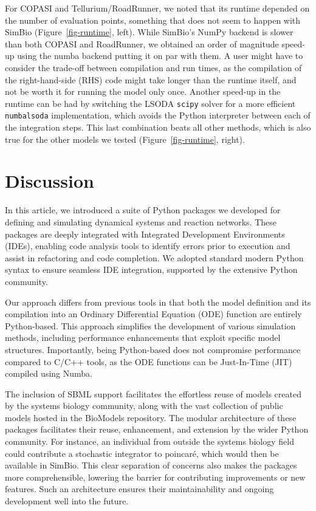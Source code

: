 \documentclass[
  letterpaper,
  DIV=11,
  numbers=noendperiod]{scrartcl}
\begin{document}
For COPASI and Tellurium/RoadRunner, we noted that its runtime depended
on the number of evaluation points, something that does not seem to
happen with SimBio (Figure~\ref{fig-runtime}, left). While SimBio's
NumPy backend is slower than both COPASI and RoadRunner, we obtained an
order of magnitude speed-up using the numba backend putting it on par
with them. A user might have to consider the trade-off between
compilation and run times, as the compilation of the right-hand-side
(RHS) code might take longer than the runtime itself, and not be worth
it for running the model only once. Another speed-up in the runtime can
be had by switching the LSODA \texttt{scipy} solver for a more efficient
\texttt{numbalsoda} implementation, which avoids the Python interpreter
between each of the integration steps. This last combination beats all
other methods, which is also true for the other models we tested
(Figure~\ref{fig-runtime}, right).

\hypertarget{discussion}{%
\section{Discussion}\label{discussion}}

In this article, we introduced a suite of Python packages we developed
for defining and simulating dynamical systems and reaction networks.
These packages are deeply integrated with Integrated Development
Environments (IDEs), enabling code analysis tools to identify errors
prior to execution and assist in refactoring and code completion. We
adopted standard modern Python syntax to ensure seamless IDE
integration, supported by the extensive Python community.

Our approach differs from previous tools in that both the model
definition and its compilation into an Ordinary Differential Equation
(ODE) function are entirely Python-based. This approach simplifies the
development of various simulation methods, including performance
enhancements that exploit specific model structures. Importantly, being
Python-based does not compromise performance compared to C/C++ tools, as
the ODE functions can be Just-In-Time (JIT) compiled using Numba.

The inclusion of SBML support facilitates the effortless reuse of models
created by the systems biology community, along with the vast collection
of public models hosted in the BioModels repository. The modular
architecture of these packages facilitates their reuse, enhancement, and
extension by the wider Python community. For instance, an individual
from outside the systems biology field could contribute a stochastic
integrator to poincaré, which would then be available in SimBio. This
clear separation of concerns also makes the packages more
comprehensible, lowering the barrier for contributing improvements or
new features. Such an architecture ensures their maintainability and
ongoing development well into the future.
\end{document}
